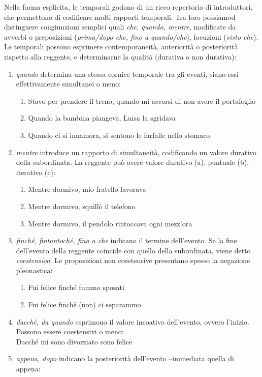 \documentclass[
  a4paper,
  twoside,
  11pt,
  chapterprefix=false,
  bibliography=totocnumbered,
  listof=flat]{scrbook}
\providecommand{\tightlist}{%
  \setlength{\itemsep}{0pt}\setlength{\parskip}{0pt}}
\begin{document}
Nella forma esplicita, le temporali godono di un ricco repertorio di introduttori, che permettono di codificare molti rapporti temporali. Tra loro possiamod distinguere congiunzioni semplici quali \emph{che, quando, mentre}, modificate da avverbi o preposizioni (\emph{prima/dopo che, fino a quando/che}), locuzioni (\emph{visto che}).
Le temporali possono esprimere contemporaneità, anteriorità o posteriorità rispetto alla reggente, e determinarne la qualità (durativa o non durativa):

\begin{enumerate}
\def\labelenumi{(\arabic{enumi})}
\setcounter{enumi}{111}
\item
  \emph{quando} determina una stessa cornice temporale tra gli eventi, siano essi effettivamente simultanei o meno:

  \begin{enumerate}
  \def\labelenumii{\alph{enumii}.}
  \tightlist
  \item
    Stavo per prendere il treno, quando mi accorsi di non avere il portafoglio
  \item
    Quando la bambina piangeva, Luisa la sgridava
  \item
    Quando ci si innamora, si sentono le farfalle nello stomaco
  \end{enumerate}
\item
  \emph{mentre} introduce un rapporto di simultaneità, codificando un valore durativo della subordinata. La reggente può avere valore durativo (a), puntuale (b), iterativo (c):

  \begin{enumerate}
  \def\labelenumii{\alph{enumii}.}
  \tightlist
  \item
    Mentre dormivo, mio fratello lavorava
  \item
    Mentre dormivo, squillò il telefono
  \item
    Mentre dormivo, il pendolo rintoccava ogni mezz'ora
  \end{enumerate}
\item
  \emph{finché, fintantoché, fino a che} indicano il termine dell'evento. Se la fine dell'evento della reggente coincide con quello della subordinata, viene detto \emph{coestensiva}. Le proposizioni non coestensive presentano spesso la negazione pleonastica:

  \begin{enumerate}
  \def\labelenumii{\alph{enumii}.}
  \tightlist
  \item
    Fui felice finché fummo sposati
  \item
    Fui felice finché (non) ci separammo
  \end{enumerate}
\item
  \emph{dacché, da quando} esprimono il valore incoativo dell'evento, ovvero l'inizio. Possono essere coestensivi o meno:\\
  Dacché mi sono divorziato sono felice
\item
  \emph{appena, dopo} indicano la posteriorità dell'evento --immediata quella di appena:


\end{enumerate}
\end{document}
